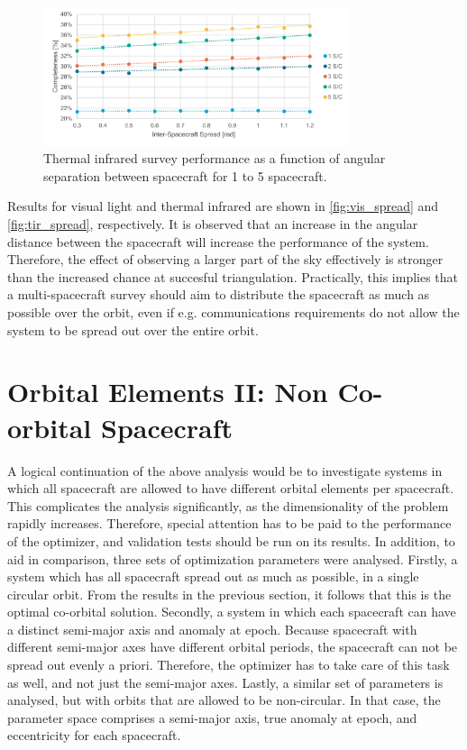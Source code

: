 \begin{figure}[htbp]
 \centering
 \includegraphics[width=0.8\textwidth]{img/tir_spread.pdf}
 \caption{Thermal infrared survey performance as a function of angular separation between spacecraft for 1 to 5 spacecraft.}
 \label{fig:tir_spread}
\end{figure}

Results for visual light and thermal infrared are shown in \autoref{fig:vis_spread} and \autoref{fig:tir_spread}, respectively. It is observed that an increase in the angular distance between the spacecraft will increase the performance of the system. Therefore, the effect of observing a larger part of the sky effectively is stronger than the increased chance at succesful triangulation. Practically, this implies that a multi-spacecraft survey should aim to distribute the spacecraft as much as possible over the orbit, even if e.g. communications requirements do not allow the system to be spread out over the entire orbit.

\section{Orbital Elements II: Non Co-orbital Spacecraft}
\label{sec:results_orbits_two}
A logical continuation of the above analysis would be to investigate systems in which all spacecraft are allowed to have different orbital elements per spacecraft. This complicates the analysis significantly, as the dimensionality of the problem rapidly increases. Therefore, special attention has to be paid to the performance of the optimizer, and validation tests should be run on its results. In addition, to aid in comparison, three sets of optimization parameters were analysed. Firstly, a system which has all spacecraft spread out as much as possible, in a single circular orbit. From the results in the previous section, it follows that this is the optimal co-orbital solution. Secondly, a system in which each spacecraft can have a distinct semi-major axis and anomaly at epoch. Because spacecraft with different semi-major axes have different orbital periods, the spacecraft can not be spread out evenly a priori. Therefore, the optimizer has to take care of this task as well, and not just the semi-major axes. Lastly, a similar set of parameters is analysed, but with orbits that are allowed to be non-circular. In that case, the parameter space comprises a semi-major axis, true anomaly at epoch, and eccentricity for each spacecraft.\\

